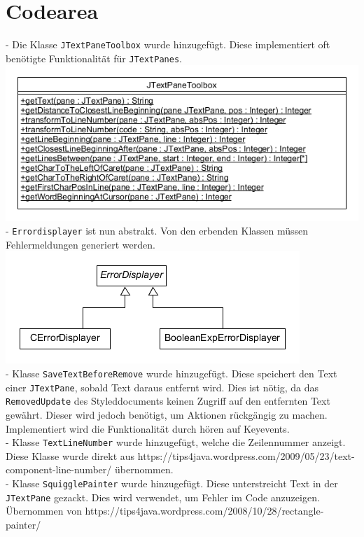 \documentclass[a4paper]{scrreprt}
\begin{document}
\section{Codearea}
- Die Klasse \verb!JTextPaneToolbox! wurde hinzugefügt. Diese implementiert oft benötigte Funktionalität für \verb!JTextPanes!.\\
\includegraphics[scale=0.5]{JTextPaneToolbox.png}\\
- \verb!Errordisplayer! ist nun abstrakt. Von den erbenden Klassen müssen Fehlermeldungen generiert werden.\\
\includegraphics[scale=0.5]{Errordisplayer_update.png}\\
- Klasse \verb!SaveTextBeforeRemove! wurde hinzugefügt. Diese speichert den Text einer \verb!JTextPane!, sobald Text daraus entfernt wird. Dies ist nötig, da das \verb!RemovedUpdate! des Styleddocuments keinen Zugriff auf den entfernten Text gewährt. Dieser wird jedoch benötigt, um Aktionen rückgängig zu machen. Implementiert wird die Funktionalität durch hören auf Keyevents.\\
- Klasse \verb!TextLineNumber! wurde hinzugefügt, welche die Zeilennummer anzeigt. Diese Klasse wurde direkt aus https://tips4java.wordpress.com/2009/05/23/text-component-line-number/ übernommen.\\
- Klasse \verb!SquigglePainter! wurde hinzugefügt. Diese unterstreicht Text in der \verb!JTextPane! gezackt. Dies wird verwendet, um Fehler im Code anzuzeigen. Übernommen von 
https://tips4java.wordpress.com/2008/10/28/rectangle-painter/\\
\end{document}
